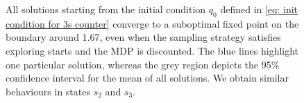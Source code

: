 \begin{figure}[ht!]
    \caption{All solutions starting from the initial condition $q_0$ defined in \eqref{eq: init condition for 3s counter} converge to a suboptimal fixed point on the boundary around 1.67, even when the sampling strategy satisfies exploring starts and the MDP is discounted.
    The blue lines highlight one particular solution, whereas the grey region depicts the 95\% confidence interval for the mean of all solutions. We obtain similar behaviours in states $s_2$ and $s_3$.}
    \label{fig: 3s IV ES}
\end{figure}